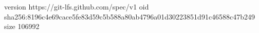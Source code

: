 version https://git-lfs.github.com/spec/v1
oid sha256:8196c4e69cace5fe83d59c5b588a80ab4796a01d30223851d91c46588c47b249
size 106992
